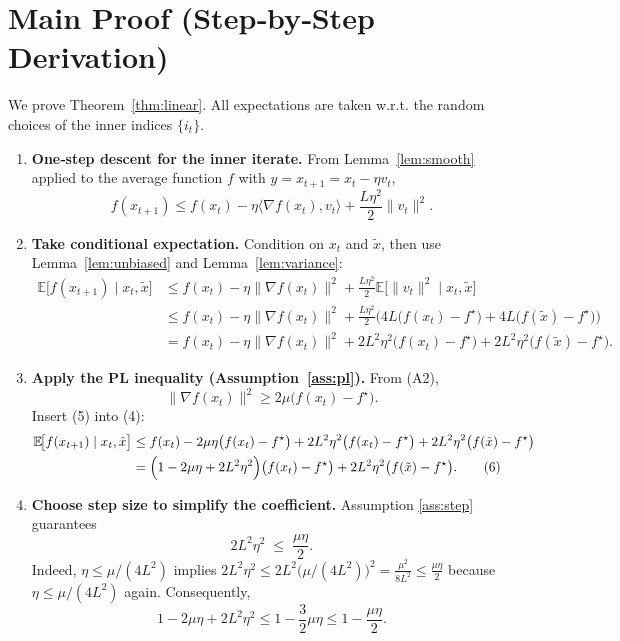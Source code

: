 \documentclass{article}
\newcommand{\E}{\mathbb{E}}
\begin{document}
\section*{Main Proof (Step‑by‑Step Derivation)}
We prove Theorem~\ref{thm:linear}. All expectations are taken w.r.t. the random choices of the inner indices $\{i_t\}$.

\begin{enumerate}[label=[Step \arabic*], leftmargin=*]
\item \textbf{One‑step descent for the inner iterate.}  
From Lemma~\ref{lem:smooth} applied to the average function $f$ with $y=x_{t+1}=x_t-\eta v_t$,
\[
f(x_{t+1})\le f(x_t)-\eta\langle\nabla f(x_t),v_t\rangle+\frac{L\eta^{2}}{2}\|v_t\|^{2}.
\tag{3}
\]

\item \textbf{Take conditional expectation.}  
Condition on $x_t$ and $\tilde{x}$, then use Lemma~\ref{lem:unbiased} and Lemma~\ref{lem:variance}:
\[
\begin{aligned}
\E\!\bigl[f(x_{t+1})\mid x_t,\tilde{x}\bigr]
&\le f(x_t)-\eta\|\nabla f(x_t)\|^{2}
   +\frac{L\eta^{2}}{2}\E\!\bigl[\|v_t\|^{2}\mid x_t,\tilde{x}\bigr]\\
&\le f(x_t)-\eta\|\nabla f(x_t)\|^{2}
   +\frac{L\eta^{2}}{2}\bigl(4L\!\bigl(f(x_t)-f^{\star}\bigr)
          +4L\!\bigl(f(\tilde{x})-f^{\star}\bigr)\bigr)\\
&= f(x_t)-\eta\|\nabla f(x_t)\|^{2}
   +2L^{2}\eta^{2}\bigl(f(x_t)-f^{\star}\bigr)
   +2L^{2}\eta^{2}\bigl(f(\tilde{x})-f^{\star}\bigr).
\tag{4}
\end{aligned}
\]

\item \textbf{Apply the PL inequality (Assumption~\ref{ass:pl}).}  
From (A2),
\[
\|\nabla f(x_t)\|^{2}\ge 2\mu\bigl(f(x_t)-f^{\star}\bigr).
\tag{5}
\]
Insert (5) into (4):
\[
\begin{aligned}
\E\!\bigl[f(x_{t+1})\mid x_t,\tilde{x}\bigr]
&\le f(x_t)-2\mu\eta\bigl(f(x_t)-f^{\star}\bigr)
   +2L^{2}\eta^{2}\bigl(f(x_t)-f^{\star}\bigr)
   +2L^{2}\eta^{2}\bigl(f(\tilde{x})-f^{\star}\bigr)\\
&= \Bigl(1-2\mu\eta+2L^{2}\eta^{2}\Bigr)\bigl(f(x_t)-f^{\star}\bigr)
   +2L^{2}\eta^{2}\bigl(f(\tilde{x})-f^{\star}\bigr).
\tag{6}
\end{aligned}
\]

\item \textbf{Choose step size to simplify the coefficient.}  
Assumption \ref{ass:step} guarantees
\[
2L^{2}\eta^{2}\;\le\;\frac{\mu\eta}{2}.
\tag{7}
\]
Indeed, $\eta\le\mu/(4L^{2})$ implies $2L^{2}\eta^{2}\le 2L^{2}\bigl(\mu/(4L^{2})\bigr)^{2}
= \frac{\mu^{2}}{8L^{2}}\le\frac{\mu\eta}{2}$ because $\eta\le\mu/(4L^{2})$ again.
Consequently,
\[
1-2\mu\eta+2L^{2}\eta^{2}
\le 1-\frac{3}{2}\mu\eta
\le 1-\frac{\mu\eta}{2}.
\tag{8}
\]


\end{enumerate}
\end{document}
